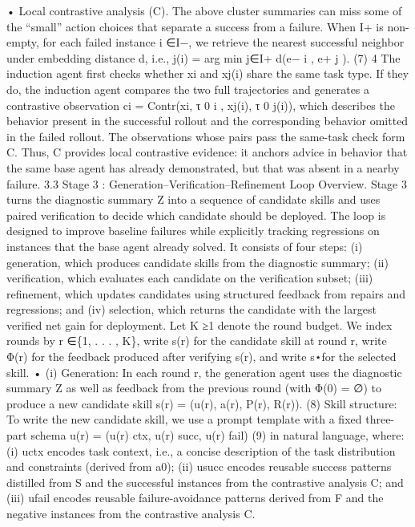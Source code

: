 • Local contrastive analysis (C). The above cluster summaries can miss some of the “small” action
choices that separate a success from a failure. When I+ is non-empty, for each failed instance i ∈I−,
we retrieve the nearest successful neighbor under embedding distance d, i.e.,
j(i) = arg min
j∈I+
d(e−
i , e+
j ).
(7)
4
The induction agent first checks whether xi and xj(i) share the same task type. If they do, the
induction agent compares the two full trajectories and generates a contrastive observation
ci = Contr(xi, τ 0
i , xj(i), τ 0
j(i)),
which describes the behavior present in the successful rollout and the corresponding behavior omitted
in the failed rollout. The observations whose pairs pass the same-task check form C. Thus, C
provides local contrastive evidence: it anchors advice in behavior that the same base agent has already
demonstrated, but that was absent in a nearby failure.
3.3
Stage 3 : Generation–Verification–Refinement Loop
Overview. Stage
3 turns the diagnostic summary Z into a sequence of candidate skills and uses
paired verification to decide which candidate should be deployed. The loop is designed to improve
baseline failures while explicitly tracking regressions on instances that the base agent already solved.
It consists of four steps: (i) generation, which produces candidate skills from the diagnostic summary;
(ii) verification, which evaluates each candidate on the verification subset; (iii) refinement, which
updates candidates using structured feedback from repairs and regressions; and (iv) selection, which
returns the candidate with the largest verified net gain for deployment. Let K ≥1 denote the round
budget. We index rounds by r ∈\{1, . . . , K\}, write s(r) for the candidate skill at round r, write Φ(r)
for the feedback produced after verifying s(r), and write s⋆for the selected skill.
• (i) Generation: In each round r, the generation agent uses the diagnostic summary Z as well as
feedback from the previous round (with Φ(0) = ∅) to produce a new candidate skill
s(r) = (u(r), a(r), P(r), R(r)).
(8)
Skill structure: To write the new candidate skill, we use a prompt template with a fixed three-part
schema
u(r) = (u(r)
ctx, u(r)
succ, u(r)
fail)
(9)
in natural language, where: (i) uctx encodes task context, i.e., a concise description of the task
distribution and constraints (derived from a0); (ii) usucc encodes reusable success patterns distilled
from S and the successful instances from the contrastive analysis C; and (iii) ufail encodes reusable
failure-avoidance patterns derived from F and the negative instances from the contrastive analysis C.

